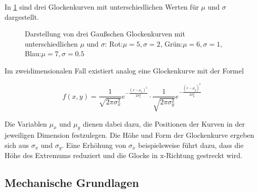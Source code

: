 \documentclass[a4paper,fontsize=12pt,toc=bib,halfparskip,ngerman]{scrartcl}
\begin{document}
In \cref{Gauss} sind drei Glockenkurven mit unterschiedlichen Werten f\"ur $\mu$ und $\sigma$ dargestellt.


\begin{figure}
	\centering
	\caption{Darstellung von drei Gau{\ss}schen Glockenkurven mit unterschiedlichen $\mu$ und $\sigma$: Rot:$\mu=5, \sigma=2$, Gr\"un:$\mu=6, \sigma=1$, Blau:$\mu=7, \sigma=0.5$}
	\label{Gauss}
\end{figure}

Im zweidimensionalen Fall existiert analog eine Glockenkurve mit der Formel

\begin{equation}
	f(x,y) = 
	\frac{1}{\sqrt{2\pi \sigma_x^2}}e^{-\frac{(x-\mu_x)^2}{2\sigma_x^2}} \cdot 
	\frac{1}{\sqrt{2\pi \sigma_y^2}}e^{-\frac{(x-\mu_y)^2}{2\sigma_y^2}}
\end{equation}

Die Variablen $\mu_x$ und $\mu_y$ dienen dabei dazu, die Positionen der Kurven in der jeweiligen Dimension festzulegen. Die H\"ohe und Form der Glockenkurve ergeben sich aus $\sigma_x$ und $\sigma_y$. Eine Erh\"ohung von $\sigma_x$ beispielsweise f\"uhrt dazu, dass die H\"ohe des Extremums reduziert und die Glocke in x-Richtung gestreckt wird.

\subsection{Mechanische Grundlagen}
\end{document}
